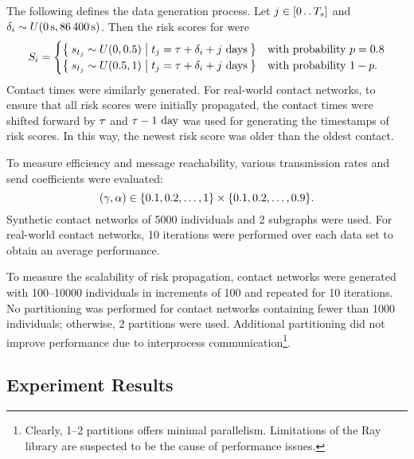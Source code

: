 The following defines the data generation process. Let $j \in [0 \mathinner{\ldotp \ldotp} T_s]$ and $\delta_i \sim U(\qty{0}{\second}, \qty{86400}{\second})$. Then the risk scores for  were
\begin{equation*}
  S_i = 
    \begin{cases}
      \Set{ s_{t_j} \sim U(\num{0}, \num{0.5}) |  t_j = \tau+ \delta_i + j \text{ days}} & \text{with probability } p = \num{0.8} \\
      \Set{ s_{t_j} \sim U(\num{0.5}, \num{1}) | t_j = \tau+ \delta_i + j \text{ days}} & \text{with probability } 1 - p.
    \end{cases}
\end{equation*}
Contact times were similarly generated. For real-world contact networks, to ensure that all risk scores were initially propagated, the contact times were shifted forward by $\tau$ and $\tau - 1 \text{ day}$ was used for generating the timestamps of risk scores. In this way, the newest risk score was older than the oldest contact.

To measure efficiency and message reachability, various transmission rates and send coefficients were evaluated:
\begin{equation*}
  (\gamma, \alpha) \in \{\num{0.1}, \num{0.2}, \ldots, \num{1}\} \times \{\num{0.1}, \num{0.2}, \ldots, \num{0.9}\}.
\end{equation*}
Synthetic contact networks of \num{5000} individuals and \num{2} subgraphs were used. For real-world contact networks, \num{10} iterations were performed over each data set to obtain an average performance.

To measure the scalability of risk propagation, contact networks were generated with \numrange{100}{10000} individuals in increments of \num{100} and repeated for \num{10} iterations. No partitioning was performed for contact networks containing fewer than \num{1000} individuals; otherwise, \num{2} partitions were used. Additional partitioning did not improve performance due to interprocess communication\footnote{Clearly, \numrange{1}{2} partitions offers minimal parallelism. Limitations of the Ray library are suspected to be the cause of performance issues.}.

\subsection{Experiment Results}

